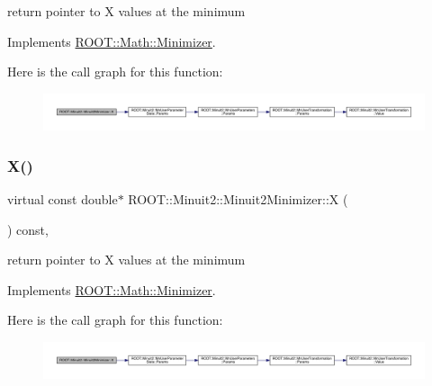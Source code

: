return pointer to X values at the minimum 



Implements \mbox{\hyperlink{classROOT_1_1Math_1_1Minimizer_a35c7c2caf54e548f892d84795209edad}{R\+O\+O\+T\+::\+Math\+::\+Minimizer}}.

Here is the call graph for this function\+:
\nopagebreak
\begin{figure}[H]
\begin{center}
\leavevmode
\includegraphics[width=350pt]{d0/d9c/classROOT_1_1Minuit2_1_1Minuit2Minimizer_ac9372eb08937cf14acb8862ba3166c26_cgraph}
\end{center}
\end{figure}
\mbox{\label{classROOT_1_1Minuit2_1_1Minuit2Minimizer_ac9372eb08937cf14acb8862ba3166c26}} 
\subsubsection{\texorpdfstring{X()}{X()}\hspace{0.1cm}{\footnotesize\ttfamily [2/3]}}
{\footnotesize\ttfamily virtual const double$\ast$ R\+O\+O\+T\+::\+Minuit2\+::\+Minuit2\+Minimizer\+::X (\begin{DoxyParamCaption}{ }\end{DoxyParamCaption}) const\hspace{0.3cm}{\ttfamily [inline]}, {\ttfamily [virtual]}}



return pointer to X values at the minimum 



Implements \mbox{\hyperlink{classROOT_1_1Math_1_1Minimizer_a35c7c2caf54e548f892d84795209edad}{R\+O\+O\+T\+::\+Math\+::\+Minimizer}}.

Here is the call graph for this function\+:
\nopagebreak
\begin{figure}[H]
\begin{center}
\leavevmode
\includegraphics[width=350pt]{d0/d9c/classROOT_1_1Minuit2_1_1Minuit2Minimizer_ac9372eb08937cf14acb8862ba3166c26_cgraph}
\end{center}
\end{figure}
\mbox{\label{classROOT_1_1Minuit2_1_1Minuit2Minimizer_ac9372eb08937cf14acb8862ba3166c26}} 
